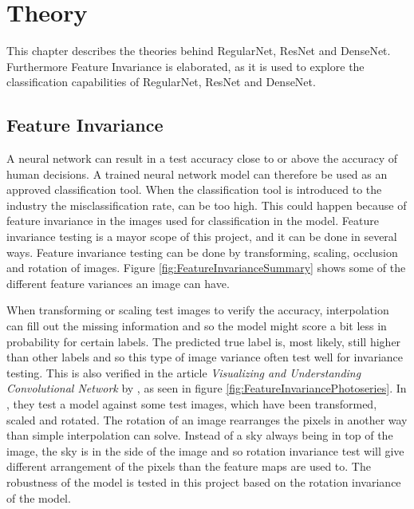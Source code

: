 \chapter{Theory}
\label{chp:theory}

This chapter describes the theories behind RegularNet, ResNet and DenseNet. Furthermore Feature Invariance is elaborated, as it is used to explore the classification capabilities of RegularNet, ResNet and DenseNet.

\section{Feature Invariance}
A neural network can result in a test accuracy close to or above the accuracy of human decisions. A trained neural network model can therefore be used as an approved classification tool. When the classification tool is introduced to the industry the misclassification rate, can be too high. This could happen because of feature invariance in the images used for classification in the model. Feature invariance testing is a mayor scope of this project, and it can be done in several ways. Feature invariance testing can be done by transforming, scaling, occlusion and rotation of images. Figure \ref{fig:FeatureInvarianceSummary} shows some of the different feature variances an image can have.

\FloatBarrier

When transforming or scaling test images to verify the accuracy, interpolation can fill out the missing information and so the model might score a bit less in probability for certain labels. The predicted true label is, most likely, still higher than other labels and so this type of image variance often test well for invariance testing. This is also verified in the article \textit{Visualizing and Understanding Convolutional Network} by \citet{Visualizing}, as seen in figure \ref{fig:FeatureInvariancePhotoseries}. In \citet{Visualizing}, they test a model against some test images, which have been transformed, scaled and rotated. The rotation of an image rearranges the pixels in another way than simple interpolation can solve. Instead of a sky always being in top of the image, the sky is in the side of the image and so rotation invariance test will give different arrangement of the pixels than the feature maps are used to. The robustness of the model is tested in this project based on the rotation invariance of the model.

\FloatBarrier


\newpage



